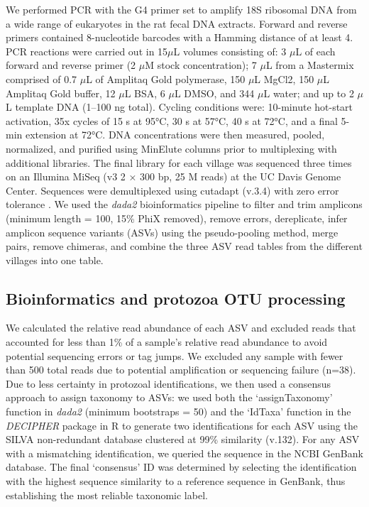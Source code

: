 \documentclass[oneside, a4paper, onecolumn, 11pt]{article}
\begin{document}
We performed PCR with the G4 primer set \citep{Gogarten2020-vf,Krogsgaard2018-lw} to amplify 18S ribosomal DNA from a wide range of eukaryotes in the rat fecal DNA extracts. Forward and reverse primers contained 8-nucleotide barcodes with a Hamming distance of at least 4. PCR reactions were carried out in 15$\mu$L volumes consisting of: 3 $\mu$L of each forward and reverse primer (2 $\mu$M stock concentration); 7 $\mu$L from a Mastermix comprised of 0.7 $\mu$L of Amplitaq Gold polymerase, 150 $\mu$L MgCl2, 150 $\mu$L Amplitaq Gold buffer, 12 $\mu$L BSA, 6 $\mu$L DMSO, and 344 $\mu$L water; and up to 2 $\mu$L template DNA (1–100 ng total). Cycling conditions were: 10-minute hot-start activation, 35x cycles of 15 s at 95°C, 30 s at 57°C, 40 s at 72°C, and a final 5-min extension at 72°C. DNA concentrations were then measured, pooled, normalized, and purified using MinElute columns prior to multiplexing with additional libraries. The final library for each village was sequenced three times on an Illumina MiSeq (v3 2 × 300 bp, 25 M reads) at the UC Davis Genome Center. Sequences were demultiplexed using cutadapt (v.3.4) with zero error tolerance \citep{Martin2011-yj}. We used the \textit{dada2} bioinformatics pipeline \citep{Callahan2016-wj} to filter and trim amplicons (minimum length = 100, 15\% PhiX removed), remove errors, dereplicate, infer amplicon sequence variants (ASVs) using the pseudo-pooling method, merge pairs, remove chimeras, and combine the three ASV read tables from the different villages into one table.

\subsection*{Bioinformatics and protozoa OTU processing}
We calculated the relative read abundance of each ASV and excluded reads that accounted for less than 1\% of a sample's relative read abundance to avoid potential sequencing errors or tag jumps. We excluded any sample with fewer than 500 total reads due to potential amplification or sequencing failure (n=38). Due to less certainty in protozoal identifications, we then used a consensus approach to assign taxonomy to ASVs: we used both the `assignTaxonomy' function in \textit{dada2} (minimum bootstraps = 50) and the `IdTaxa' function in the \textit{DECIPHER} package in R \citep{Murali2018-hm} to generate two identifications for each ASV using the SILVA non-redundant database clustered at 99\% similarity (v.132). For any ASV with a mismatching identification, we queried the sequence in the NCBI GenBank database. The final ‘consensus’ ID was determined by selecting the identification with the highest sequence similarity to a reference sequence in GenBank, thus establishing the most reliable taxonomic label.
\end{document}
